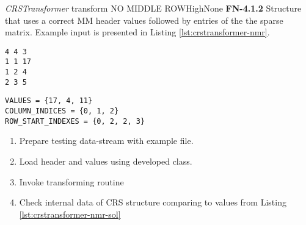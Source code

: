 \begin{testcase}{\emph{CRSTransformer} transform NO MIDDLE ROW}{High}{None}
	{
		\textbf{FN-4.1.2}
	}
	{
		Structure that uses a correct \gls{MM} header values followed by entries of the the sparse matrix. Example input is presented in Listing \ref{lst:crstransformer-nmr}. 	
	}
	\begin{lstlisting}[label={lst:crstransformer-nmr},
	basicstyle=\small,caption={\gls{MM} format data example}, frame=single]
%%MatrixMarket matrix coordinate real general
4 4 3
1 1 17
1 2 4
2 3 5
	\end{lstlisting}
	\begin{lstlisting}[label={lst:crstransformer-nmr-sol},
	basicstyle=\small,caption={\gls{CRS} format internal data example}, frame=single]
VALUES = {17, 4, 11}
COLUMN_INDICES = {0, 1, 2}
ROW_START_INDEXES = {0, 2, 2, 3}
	\end{lstlisting}
	{
		\begin{enumerate}
			\item Prepare testing data-stream with example file.
			\item Load header and values using developed class.
			\item Invoke transforming routine 
			\item
			{
				Check internal data of \gls{CRS} structure comparing to values from Listing \ref{lst:crstransformer-nmr-sol} 
			}
		\end{enumerate}
	}
\end{testcase}

